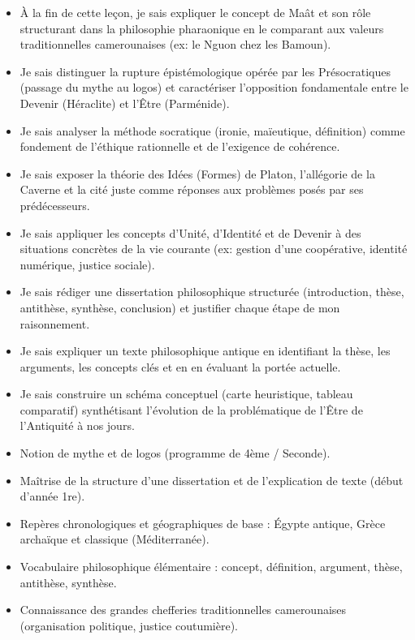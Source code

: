 \documentclass[11pt]{article}
\begin{document}
\begin{objectifs}
\begin{itemize}
\item À la fin de cette leçon, je sais expliquer le concept de Maât et son rôle structurant dans la philosophie pharaonique en le comparant aux valeurs traditionnelles camerounaises (ex: le Nguon chez les Bamoun).
\item Je sais distinguer la rupture épistémologique opérée par les Présocratiques (passage du mythe au logos) et caractériser l'opposition fondamentale entre le Devenir (Héraclite) et l'Être (Parménide).
\item Je sais analyser la méthode socratique (ironie, maïeutique, définition) comme fondement de l'éthique rationnelle et de l'exigence de cohérence.
\item Je sais exposer la théorie des Idées (Formes) de Platon, l'allégorie de la Caverne et la cité juste comme réponses aux problèmes posés par ses prédécesseurs.
\item Je sais appliquer les concepts d'Unité, d'Identité et de Devenir à des situations concrètes de la vie courante (ex: gestion d'une coopérative, identité numérique, justice sociale).
\item Je sais rédiger une dissertation philosophique structurée (introduction, thèse, antithèse, synthèse, conclusion) et justifier chaque étape de mon raisonnement.
\item Je sais expliquer un texte philosophique antique en identifiant la thèse, les arguments, les concepts clés et en en évaluant la portée actuelle.
\item Je sais construire un schéma conceptuel (carte heuristique, tableau comparatif) synthétisant l'évolution de la problématique de l'Être de l'Antiquité à nos jours.
\end{itemize}
\end{objectifs}

\begin{prerequis}
\begin{itemize}
\item Notion de mythe et de logos (programme de 4ème / Seconde).
\item Maîtrise de la structure d'une dissertation et de l'explication de texte (début d'année 1re).
\item Repères chronologiques et géographiques de base : Égypte antique, Grèce archaïque et classique (Méditerranée).
\item Vocabulaire philosophique élémentaire : concept, définition, argument, thèse, antithèse, synthèse.
\item Connaissance des grandes chefferies traditionnelles camerounaises (organisation politique, justice coutumière).
\end{itemize}
\end{prerequis}
\end{document}
